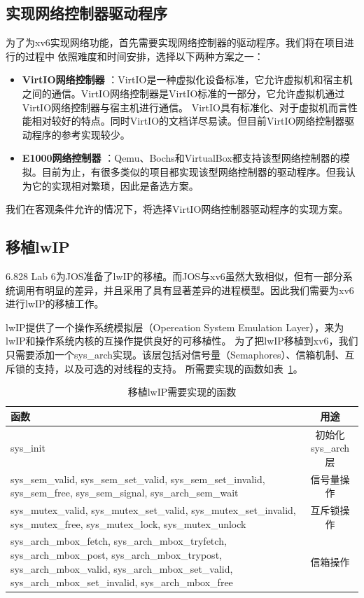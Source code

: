 \documentclass[a4paper,twoside]{article}
\begin{document}
\begin{spacing}{1.2}
\subsection{实现网络控制器驱动程序}

为了为xv6实现网络功能，首先需要实现网络控制器的驱动程序。我们将在项目进行的过程中
依照难度和时间安排，选择以下两种方案之一：

\begin{itemize}
	\item \textbf{VirtIO网络控制器 }：VirtIO\cite{russell2008virtio}是一种虚拟化设备标准，它允许虚拟机和宿主机之间的通信。VirtIO网络控制器是VirtIO标准的一部分，它允许虚拟机通过VirtIO网络控制器与宿主机进行通信。
	VirtIO具有标准化、对于虚拟机而言性能相对较好的特点。同时VirtIO的文档详尽易读。但目前VirtIO网络控制器驱动程序的参考实现较少。
	\item \textbf{E1000网络控制器 }：Qemu、Bochs和VirtualBox都支持该型网络控制器的模拟。目前为止，有很多类似的项目都实现该型网络控制器的驱动程序。但我认为它的实现相对繁琐，因此是备选方案。
\end{itemize}

我们在客观条件允许的情况下，将选择VirtIO网络控制器驱动程序的实现方案。

\subsection{移植lwIP}

6.828 Lab 6为JOS准备了lwIP的移植。而JOS与xv6虽然大致相似，但有一部分系统调用有明显的差异，并且采用了具有显著差异的进程模型。因此我们需要为xv6
进行lwIP的移植工作。

lwIP提供了一个操作系统模拟层（Opereation System Emulation Layer），来为lwIP和操作系统内核的互操作提供良好的可移植性。
为了把lwIP移植到xv6，我们只需要添加一个sys\_arch实现。该层包括对信号量（Semaphores）、信箱机制、互斥锁的支持，以及可选的对线程的支持。
所需要实现的函数如表~\ref{tbl:lwip}。

\begin{table}[htb]
	\centering
	\caption{移植lwIP需要实现的函数}
	\label{tbl:lwip}
	\begin{tabular}{p{4cm}|c}
		\toprule
		\hline
		函数 & 用途 \\
		\hline
		sys\_init & 初始化sys\_arch层 \\
		\hline
		sys\_sem\_valid, sys\_sem\_set\_valid, sys\_sem\_set\_invalid, sys\_sem\_free, sys\_sem\_signal, sys\_arch\_sem\_wait & 信号量操作 \\
		\hline 
		sys\_mutex\_valid, sys\_mutex\_set\_valid, sys\_mutex\_set\_invalid, sys\_mutex\_free, sys\_mutex\_lock, sys\_mutex\_unlock & 互斥锁操作 \\
		\hline
		sys\_arch\_mbox\_fetch, sys\_arch\_mbox\_tryfetch, sys\_arch\_mbox\_post, sys\_arch\_mbox\_trypost, sys\_arch\_mbox\_valid, sys\_arch\_mbox\_set\_valid, sys\_arch\_mbox\_set\_invalid, sys\_arch\_mbox\_free & 信箱操作 \\
		\hline
		\bottomrule


\end{tabular}
\end{table}
\end{spacing}
\end{document}
